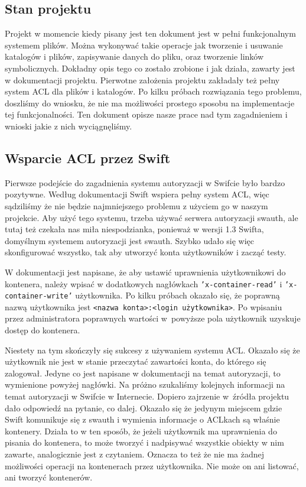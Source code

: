 	\subsection{Stan projektu}\label{sec:stan projektu}

	Projekt w momencie kiedy pisany jest ten dokument jest w pełni funkcjonalnym systemem plików. Można wykonywać takie operacje jak tworzenie i usuwanie katalogów i plików, zapisywanie danych do pliku, oraz tworzenie linków symbolicznych. Dokładny opis tego co zostało zrobione i jak działa, zawarty jest w dokumentacji projektu. Pierwotne założenia projektu zakładały też pełny system ACL dla plików i katalogów. Po kilku próbach rozwiązania tego problemu, doszliśmy do wniosku, że nie ma możliwości prostego sposobu na implementacje tej funkcjonalności. Ten dokument opisze nasze prace nad tym zagadnieniem i wnioski jakie z nich wyciągnęliśmy.
	
	\subsection{Wsparcie ACL przez Swift}\label{sec:wsparcie acl przez swift}

	Pierwsze podejście do zagadnienia systemu autoryzacji w Swifcie było bardzo pozytywne. Według dokumentacji Swift wspiera pełny system ACL, więc sądziliśmy że nie będzie najmniejszego problemu z użyciem go w naszym projekcie. Aby użyć tego systemu, trzeba używać serwera autoryzacji swauth, ale tutaj też czekała nas miła niespodzianka, ponieważ w wersji 1.3 Swifta, domyślnym systemem autoryzacji jest swauth. Szybko udało się więc skonfigurować wszystko, tak aby utworzyć konta użytkowników i zacząć testy.

	W dokumentacji jest napisane, że aby ustawić uprawnienia użytkownikowi do kontenera, należy wpisać w dodatkowych nagłówkach \texttt{'x-container-read'} i \texttt{'x-container-write'} użytkownika. Po kilku próbach okazało się, że poprawną nazwą użytkownika jest \texttt{<nazwa konta>:<login użytkownika>}. Po wpisaniu przez administratora poprawnych wartości w~powyższe pola użytkownik uzyskuje dostęp do kontenera.

	Niestety na tym skończyły się sukcesy z używaniem systemu ACL. Okazało się że użytkownik nie jest w stanie przeczytać zawartości konta, do którego się zalogował. Jedyne co jest napisane w dokumentacji na temat autoryzacji, to wymienione powyżej nagłówki. Na próżno szukaliśmy kolejnych informacji na temat autoryzacji w Swifcie w Internecie. Dopiero zajrzenie w~źródła projektu dało odpowiedź na pytanie, co dalej. Okazało się że jedynym miejscem gdzie Swift komunikuje się z swauth i wymienia informacje o ACLkach są właśnie kontenery. Działa to w ten sposób, że jeżeli użytkownik ma uprawnienia do pisania do kontenera, to może tworzyć i nadpisywać wszystkie obiekty w nim zawarte, analogicznie jest z czytaniem. Oznacza to też że nie ma żadnej możliwości operacji na kontenerach przez użytkownika. Nie może on ani listować, ani tworzyć kontenerów.

